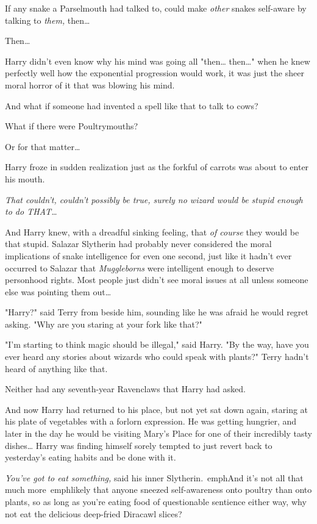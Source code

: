 If any snake a Parselmouth had talked to, could make \emph{other} snakes 
self-aware by talking to \emph{them,} then{\ldots}

Then{\ldots}

Harry didn't even know why his mind was going all "then{\ldots} then{\ldots}" 
when he knew perfectly well how the exponential progression would work, it was 
just the sheer moral horror of it that was blowing his mind.

And what if someone had invented a spell like that to talk to cows?

What if there were Poultrymouths?

Or for that matter{\ldots}

Harry froze in sudden realization just as the forkful of carrots was about to 
enter his mouth.

\emph{That couldn't, couldn't possibly be true, surely no wizard would be 
stupid enough to do THAT{\ldots}}

And Harry knew, with a dreadful sinking feeling, that \emph{of course} they 
would be that stupid. Salazar Slytherin had probably never considered the moral 
implications of snake intelligence for even one second, just like it hadn't 
ever occurred to Salazar that \emph{Muggleborns} were intelligent enough to 
deserve personhood rights. Most people just didn't see moral issues at all 
unless someone else was pointing them out{\ldots}

"Harry?" said Terry from beside him, sounding like he was afraid he would 
regret asking. "Why are you staring at your fork like that?"

"I'm starting to think magic should be illegal," said Harry. "By the way, have 
you ever heard any stories about wizards who could speak with plants?"
\sbreak
Terry hadn't heard of anything like that.

Neither had any seventh-year Ravenclaws that Harry had asked.

And now Harry had returned to his place, but not yet sat down again, staring at 
his plate of vegetables with a forlorn expression. He was getting hungrier, and 
later in the day he would be visiting Mary's Place for one of their incredibly 
tasty dishes{\ldots} Harry was finding himself sorely tempted to just revert 
back to yesterday's eating habits and be done with it.

\emph{You've got to eat something,} said his inner Slytherin.\ emph{And it's 
not all that much} more\ emph{likely that anyone sneezed self-awareness onto 
poultry than onto plants, so as long as you're eating food of questionable 
sentience either way, why not eat the delicious deep-fried Diracawl slices?}

